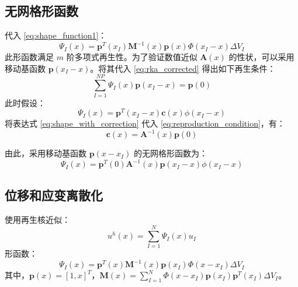 \documentclass[engineeringmaster]{hquThesis}
\begin{document}
\subsection*{无网格形函数}
代入 \eqref{eq:shape_function1}：
\begin{equation}
    \Psi_I(x) = \boldsymbol{p}^T(x_I) \boldsymbol{M}^{-1}(x) \boldsymbol{p}(x) \Phi(x_I - x) \Delta V_I
    \label{eq:meshless_shape_function}
\end{equation}
此形函数满足 \( m \) 阶多项式再生性。为了验证数值近似 \(\boldsymbol{A}(x)\) 的性状，可以采用移动基函数 \(\boldsymbol{p}(x_I - x)\)。将其代入 \eqref{eq:rka_corrected} 得出如下再生条件：
\begin{equation}
    \sum_{I=1}^{NP} \Psi_I(x) \boldsymbol{p}( x_I - x) = \boldsymbol{p}(0)
    \label{eq:reproduction_condition}
\end{equation}
此时假设：
\begin{equation}
    \Psi_I(x) = \boldsymbol{p}^T(x_I - x) \boldsymbol{c}(x) \phi( x_I - x)
    \label{eq:shape_with_correction}
\end{equation}
将表达式 \eqref{eq:shape_with_correction} 代入 \eqref{eq:reproduction_condition}，有：
\begin{equation}
    \boldsymbol{c}(x) = \boldsymbol{A}^{-1}(x) \boldsymbol{p}( 0)
    \label{eq:correction_coefficient}
\end{equation}

由此，采用移动基函数 \(\boldsymbol{p}( x - x_I)\) 的无网格形函数为：
\begin{equation}
    \Psi_I(x) = \boldsymbol{p}^T(0) \boldsymbol{A}^{-1}(x) \boldsymbol{p}( x_I - x) \phi( x_I - x)
    \label{eq:shape_moving}
\end{equation}


\subsection*{位移和应变离散化}
使用再生核近似：
\begin{equation}
    u^h(x) = \sum_{I=1}^N \Psi_I(x) u_I
    \label{eq:discrete_u1}
\end{equation}
形函数：
\begin{equation}
    \Psi_I(x) = \boldsymbol{p}^T(x) \boldsymbol{M}^{-1}(x) \boldsymbol{p}(x_I) \Phi(x - x_I) \Delta V_I
    \label{eq:shape_function}
\end{equation}
其中，\( \boldsymbol{p}(x) = [1, x]^T \)，\( \boldsymbol{M}(x) = \sum_{I=1}^N \Phi(x - x_I) \boldsymbol{p}(x_I) \boldsymbol{p}^T(x_I) \Delta V_I \)。
\end{document}
